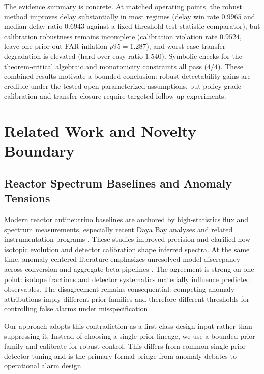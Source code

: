 \documentclass{article} %
\begin{document}
The evidence summary is concrete. At matched operating points, the robust method improves delay substantially in most regimes (delay win rate $0.9965$ and median delay ratio $0.6943$ against a fixed-threshold test-statistic comparator), but calibration robustness remains incomplete (calibration violation rate $0.9524$, leave-one-prior-out FAR inflation $p95=1.287$), and worst-case transfer degradation is elevated (hard-over-easy ratio $1.540$). Symbolic checks for the theorem-critical algebraic and monotonicity constraints all pass ($4/4$). These combined results motivate a bounded conclusion: robust detectability gains are credible under the tested open-parameterized assumptions, but policy-grade calibration and transfer closure require targeted follow-up experiments.

\section{Related Work and Novelty Boundary}\label{sec:related_work}
\subsection{Reactor Spectrum Baselines and Anomaly Tensions}
Modern reactor antineutrino baselines are anchored by high-statistics flux and spectrum measurements, especially recent Daya Bay analyses and related instrumentation programs \citep{SRC002,SRC003,SRC012,SRC013,SRC014}. These studies improved precision and clarified how isotopic evolution and detector calibration shape inferred spectra. At the same time, anomaly-centered literature emphasizes unresolved model discrepancy across conversion and aggregate-beta pipelines \citep{SRC005,SRC015,SRC029,SRC030,SRC031}. The agreement is strong on one point: isotope fractions and detector systematics materially influence predicted observables. The disagreement remains consequential: competing anomaly attributions imply different prior families and therefore different thresholds for controlling false alarms under misspecification.

Our approach adopts this contradiction as a first-class design input rather than suppressing it. Instead of choosing a single prior lineage, we use a bounded prior family and calibrate for robust control. This differs from common single-prior detector tuning and is the primary formal bridge from anomaly debates to operational alarm design.
\end{document}
